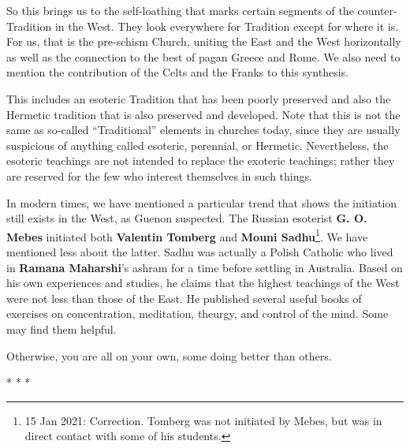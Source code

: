 So this brings us to the self-loathing that marks certain segments of the counter-Tradition in the West. They look everywhere for Tradition except for where it is. For us, that is the pre-schism Church, uniting the East and the West horizontally as well as the connection to the best of pagan Greece and Rome. We also need to mention the contribution of the Celts and the Franks to this synthesis.

This includes an esoteric Tradition that has been poorly preserved and also the Hermetic tradition that is also preserved and developed. Note that this is not the same as so-called ``Traditional'' elements in churches today, since they are usually suspicious of anything called esoteric, perennial, or Hermetic. Nevertheless, the esoteric teachings are not intended to replace the exoteric teachings; rather they are reserved for the few who interest themselves in such things.

In modern times, we have mentioned a particular trend that shows the initiation still exists in the West, as Guenon suspected. The Russian esoterist \textbf{G. O. Mebes} initiated both \textbf{Valentin Tomberg} and \textbf{Mouni Sadhu}\footnote{15 Jan 2021: Correction. Tomberg was not initiated by Mebes, but was in direct contact with some of his students.}. We have mentioned less about the latter. Sadhu was actually a Polish Catholic who lived in \textbf{Ramana Maharshi}'s ashram for a time before settling in Australia. Based on his own experiences and studies, he claims that the highest teachings of the West were not less than those of the East. He published several useful books of exercises on concentration, meditation, theurgy, and control of the mind. Some may find them helpful.

Otherwise, you are all on your own, some doing better than others.


\begin{center}* * *\end{center}

